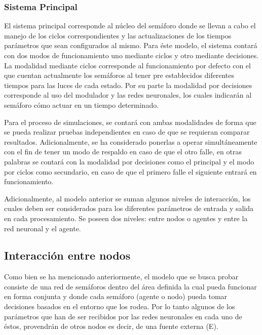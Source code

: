 \subsubsection{Sistema Principal}

El sistema principal corresponde al n\'{u}cleo del sem\'{a}foro donde se llevan a cabo el manejo de los ciclos correspondientes y las actualizaciones de los tiempos par\'{a}metros que sean configurados al mismo. Para \'{e}ste modelo, el sistema contar\'{a} con dos modos de funcionamiento uno mediante ciclos y otro mediante decisiones. La modalidad mediante ciclos corresponde al funcionamiento por defecto con el que cuentan actualmente los sem\'{a}foros al tener pre establecidos diferentes tiempos para las luces de cada estado. Por su parte la modalidad por decisiones corresponde al uso del modulador y las redes neuronales, los cuales indicar\'{a}n al sem\'{a}foro c\'{o}mo actuar en un tiempo determinado. 

Para el proceso de simulaciones, se contar\'{a} con ambas modalidades de forma que se pueda realizar pruebas independientes en caso de que se requieran comparar resultados. Adicionalmente, se ha considerado ponerlas a operar simult\'{a}neamente con el fin de tener un modo de respaldo en caso de que el otro falle, en otras palabras se contar\'{a} con la modalidad por decisiones como el principal y el modo por ciclos como secundario, en caso de que el primero falle el siguiente entrar\'{a} en funcionamiento.

Adicionalmente, al modelo anterior se suman algunos niveles de interacci\'{o}n, los cuales deben ser considerados para los diferentes par\'{a}metros de entrada y salida en cada procesamiento. Se poseen dos niveles: entre nodos o agentes y entre la red neuronal y el agente.

\subsection{Interacci\'{o}n entre nodos}

Como bien se ha mencionado anteriormente, el modelo que se busca probar consiste de una red de sem\'{a}foros dentro del \'{a}rea definida la cual pueda funcionar en forma conjunta y donde cada sem\'{a}foro (agente o nodo) pueda tomar decisiones basados en el entorno que los rodea. Por lo tanto algunos de los par\'{a}metros que han de ser recibidos por las redes neuronales en cada uno de \'{e}stos, provendr\'{a}n de otros nodos es decir, de una fuente externa (E).

